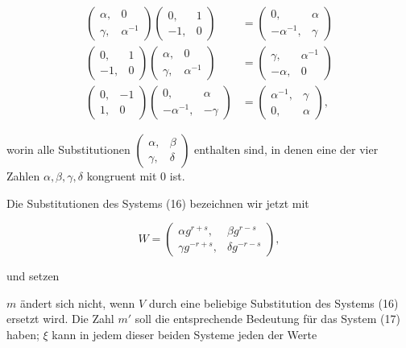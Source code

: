 \begin{align*}
\begin{pmatrix}\alpha, & 0\\ \gamma, & \alpha^{-1}\end{pmatrix}\begin{pmatrix}0, & 1\\ -1, & 0\end{pmatrix} &=\begin{pmatrix}0, & \alpha\\ -\alpha^{-1}, & \gamma\end{pmatrix}\\
\begin{pmatrix}0, & 1\\ -1, & 0\end{pmatrix}\begin{pmatrix}\alpha, & 0\\ \gamma, & \alpha^{-1}\end{pmatrix} &=\begin{pmatrix}\gamma, & \alpha^{-1}\\ -\alpha, & 0\end{pmatrix}\\
\begin{pmatrix}0, & -1\\ 1, & 0\end{pmatrix}\begin{pmatrix}0, & \alpha\\ -\alpha^{-1}, & -\gamma\end{pmatrix} &=\begin{pmatrix}\alpha^{-1}, & \gamma\\ 0, & \alpha\end{pmatrix},
\end{align*}

worin alle Substitutionen $\begin{pmatrix}\alpha, & \beta\\ \gamma, & \delta\end{pmatrix}$ enthalten sind, in denen eine der vier Zahlen $\alpha,\beta,\gamma,\delta$ kongruent mit $0$ ist.

Die Substitutionen des Systems (16) bezeichnen wir jetzt mit

\[ W=\begin{pmatrix}\alpha g^{r+s}, & \beta g^{r-s}\\ \gamma g^{-r+s}, & \delta g^{-r-s}\end{pmatrix}, \]

und setzen



$m$ ändert sich nicht, wenn $V$ durch eine beliebige Substitution des Systems (16) ersetzt wird. Die Zahl $m'$ soll die entsprechende Bedeutung für das System (17) haben; $\xi$ kann in jedem dieser beiden Systeme jeden der Werte

